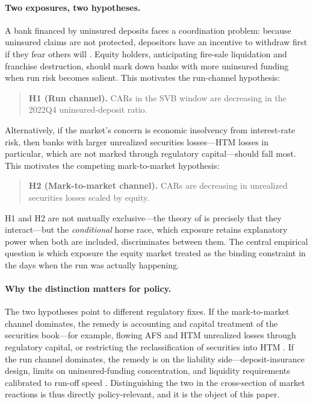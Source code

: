 \documentclass[12pt]{article}
\begin{document}
\paragraph{Two exposures, two hypotheses.} A bank financed by uninsured deposits faces a
coordination problem: because uninsured claims are not protected, depositors have an
incentive to withdraw first if they fear others will \citep{diamond1983,goldstein2005}.
Equity holders, anticipating fire-sale liquidation and franchise destruction, should mark
down banks with more uninsured funding when run risk becomes salient. This motivates the
run-channel hypothesis:
\begin{quote}
\textbf{H1 (Run channel).} CARs in the SVB window are decreasing in the 2022Q4
uninsured-deposit ratio.
\end{quote}
Alternatively, if the market's concern is economic insolvency from interest-rate risk, then
banks with larger unrealized securities losses---HTM losses in particular, which are not
marked through regulatory capital---should fall most. This motivates the competing
mark-to-market hypothesis:
\begin{quote}
\textbf{H2 (Mark-to-market channel).} CARs are decreasing in unrealized securities losses
scaled by equity.
\end{quote}
H1 and H2 are not mutually exclusive---the theory of \citet{jiang2024} is precisely that
they interact---but the \emph{conditional} horse race, which exposure retains explanatory
power when both are included, discriminates between them. The central empirical question is
which exposure the equity market treated as the binding constraint in the days when the run
was actually happening.

\paragraph{Why the distinction matters for policy.} The two hypotheses point to different
regulatory fixes. If the mark-to-market channel dominates, the remedy is accounting and
capital treatment of the securities book---for example, flowing AFS and HTM unrealized
losses through regulatory capital, or restricting the reclassification of securities into
HTM \citep{granja2023}. If the run channel dominates, the remedy is on the liability
side---deposit-insurance design, limits on uninsured-funding concentration, and liquidity
requirements calibrated to run-off speed \citep{drechsler2023}. Distinguishing the two in the
cross-section of market reactions is thus directly policy-relevant, and it is the object of
this paper.
\end{document}
